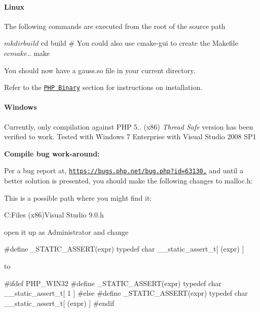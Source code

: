 \paragraph*{Linux}

The following commands are executed from the root of the source path \begin{DoxyVerb}$ mkdir build
$ cd build
# You could also use cmake-gui to create the Makefile
$ ccmake ..
$ make
\end{DoxyVerb}


You should now have a {\ttfamily gauss.\-so} file in your current directory.

Refer to the \href{#php_install_binary}{\tt P\-H\-P Binary} section for instructions on installation.

\paragraph*{Windows}

Currently, only compilation against P\-H\-P 5.. (x86) {\itshape Thread Safe} version has been verified to work. Tested with Windows 7 Enterprise with Visual Studio 2008 S\-P1

{\bfseries Compile bug work-\/around\-:}

Per a bug report at, \href{https://bugs.php.net/bug.php?id=63130,}{\tt https\-://bugs.\-php.\-net/bug.\-php?id=63130,} and until a better solution is presented, you should make the following changes to {\ttfamily malloc.\-h}\-:

This is a possible path where you might find it\-: \begin{DoxyVerb}C:\Program Files (x86)\Microsoft Visual Studio 9.0\VC\malloc.h
\end{DoxyVerb}


open it up as Administrator and change


\begin{DoxyCode}
\textcolor{preprocessor}{#define \_STATIC\_ASSERT(expr) typedef char \_\_static\_assert\_t[ (expr) ]}
\end{DoxyCode}
 to 
\begin{DoxyCode}
\textcolor{preprocessor}{#ifdef PHP\_WIN32}
\textcolor{preprocessor}{}\textcolor{preprocessor}{#define \_STATIC\_ASSERT(expr) typedef char \_\_static\_assert\_t[ 1 ]}
\textcolor{preprocessor}{}\textcolor{preprocessor}{#else}
\textcolor{preprocessor}{}\textcolor{preprocessor}{#define \_STATIC\_ASSERT(expr) typedef char \_\_static\_assert\_t[ (expr) ]}
\textcolor{preprocessor}{#endif}
\end{DoxyCode}


